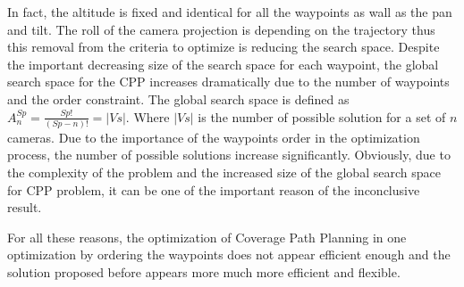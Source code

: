\begin{itemize}
	 In fact, the altitude is fixed and identical for all the waypoints as  wall as the pan and tilt. The roll of the camera projection is depending on the trajectory thus this removal from the criteria to optimize is reducing the search space.
		Despite the important decreasing size of the search space for each waypoint, the global search space for the CPP increases dramatically  due to the number of waypoints and the order constraint. The global search space is defined as $A^{Sp}_{n}=\frac{Sp!}{(Sp-n)!} = |Vs|$.
 Where $|Vs|$ is the number of possible solution for a set of $n$ cameras. Due to the importance of the waypoints order in the optimization process, the number of possible solutions increase significantly. Obviously, due to the complexity of the problem and the increased size of the global search space for CPP problem, it  can be one of the important reason of the inconclusive result.
 \end{itemize}
		
For all these reasons, the  optimization of Coverage Path Planning  in one optimization by ordering the waypoints does not appear efficient enough and the solution proposed before appears more much more efficient and flexible.





